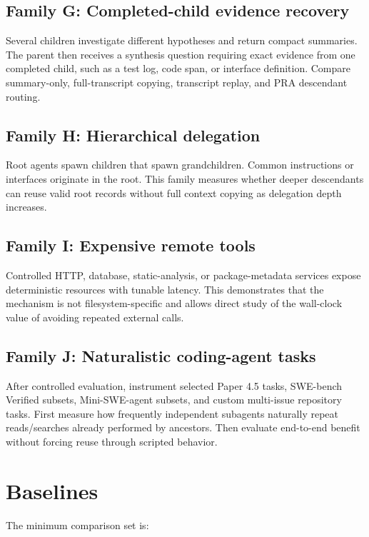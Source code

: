 \documentclass[11pt]{article}
\begin{document}
\subsection{Family G: Completed-child evidence recovery}

Several children investigate different hypotheses and return compact summaries. The parent then receives a synthesis question requiring exact evidence from one completed child, such as a test log, code span, or interface definition. Compare summary-only, full-transcript copying, transcript replay, and PRA descendant routing.

\subsection{Family H: Hierarchical delegation}

Root agents spawn children that spawn grandchildren. Common instructions or interfaces originate in the root. This family measures whether deeper descendants can reuse valid root records without full context copying as delegation depth increases.

\subsection{Family I: Expensive remote tools}

Controlled HTTP, database, static-analysis, or package-metadata services expose deterministic resources with tunable latency. This demonstrates that the mechanism is not filesystem-specific and allows direct study of the wall-clock value of avoiding repeated external calls.

\subsection{Family J: Naturalistic coding-agent tasks}

After controlled evaluation, instrument selected Paper 4.5 tasks, SWE-bench Verified subsets, Mini-SWE-agent subsets, and custom multi-issue repository tasks. First measure how frequently independent subagents naturally repeat reads/searches already performed by ancestors. Then evaluate end-to-end benefit without forcing reuse through scripted behavior.

\section{Baselines}

The minimum comparison set is:
\end{document}

